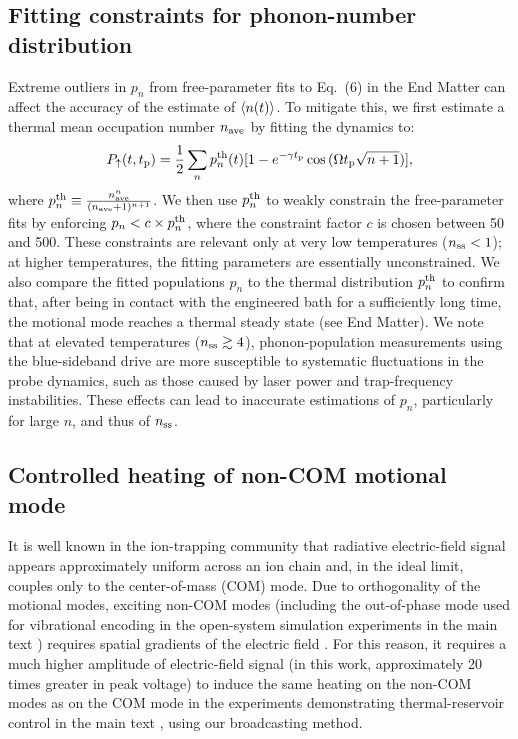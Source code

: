 \documentclass[%
reprint,
superscriptaddress,
amsmath,amssymb,
aps,
prl,
floatfix,
]{revtex4-2}
\begin{document}
\vspace{0em}
\subsection*{Fitting constraints for phonon-number distribution} \label{app_constraint}
\vspace{0em}
Extreme outliers in $p_n$ from free-parameter fits to Eq.~(6) in the End Matter \cite{so2025fT} can affect the accuracy of the estimate of $\braket{n(t)}$. To mitigate this, we first estimate a thermal mean occupation number $n_{\rm ave}$ by fitting the dynamics to:
\begin{equation}
    P_{\uparrow} (t,t_{\rm p})=\frac{1}{2}\sum_n p_n^{\rm th}(t)[1-e^{-\gamma t_{\rm p}}\cos{( \Omega t_{\rm p}\sqrt{n+1})}],
    \label{eq_thermal}
\end{equation}
where $p_n^{\rm th}\equiv\frac{n_{\rm ave}^n}{(n_{\rm ave}+1)^{n+1}}$. We then use $p_n^{\rm th}$ to weakly constrain the free-parameter fits by enforcing $p_n<c\times p_n^{\rm th}$, where the constraint factor $c$ is chosen between 50 and 500. These constraints are relevant only at very low temperatures ($n_{\rm ss}<1$); at higher temperatures, the fitting parameters are essentially unconstrained. We also compare the fitted populations $p_n$ to the thermal distribution $p_n^{\rm th}$ to confirm that, after being in contact with the engineered bath for a sufficiently long time, the motional mode reaches a thermal steady state (see End Matter). We note that at elevated temperatures ($n_{\rm ss}\gtrsim 4$), phonon-population measurements using the blue-sideband drive are more susceptible to systematic fluctuations in the probe dynamics, such as those caused by laser power and trap-frequency instabilities. These effects can lead to inaccurate estimations of $p_n$, particularly for large $n$, and thus of $n_{\rm ss}$.

\subsection*{Controlled heating of non-COM motional mode} \label{app_noncom}

It is well known in the ion-trapping community that radiative electric-field signal appears approximately uniform across an ion chain and, in the ideal limit, couples only to the center-of-mass (COM) mode. Due to orthogonality of the motional modes, exciting non-COM modes (including the out-of-phase mode used for vibrational encoding in the open-system simulation experiments in the main text \cite{so2025fT}) requires spatial gradients of the electric field \cite{wineland1997issue,brownnutt2015noise,james2000noise}. For this reason, it requires a much higher amplitude of electric-field signal (in this work, approximately 20 times greater in peak voltage) to induce the same heating on the non-COM modes as on the COM mode in the experiments demonstrating thermal-reservoir control in the main text \cite{so2025fT}, using our broadcasting method.
\end{document}
